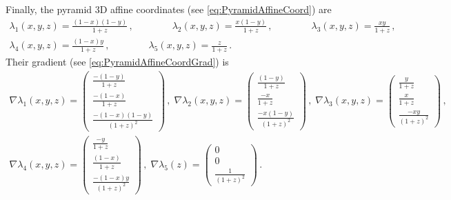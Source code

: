 Finally, the pyramid 3D affine coordinates (see \eqref{eq:PyramidAffineCoord}) are
\begin{equation}
	\begin{gathered}
    \lambda_1(x,y,z)=\textstyle{\frac{(1-x)(1-y)}{1+z}}\,,\qquad\qquad
    \lambda_2(x,y,z)=\textstyle{\frac{x(1-y)}{1+z}}\,,\qquad\qquad
    \lambda_3(x,y,z)=\textstyle{\frac{xy}{1+z}}\,,\\
    \lambda_4(x,y,z)=\textstyle{\frac{(1-x)y}{1+z}}\,,\qquad\qquad
    \lambda_5(x,y,z)=\textstyle{\frac{z}{1+z}}\,.
	\end{gathered}
\end{equation}
Their gradient (see \eqref{eq:PyramidAffineCoordGrad}) is
\begin{equation}
	\begin{gathered}
    \nabla\lambda_1(x,y,z)=\begin{pmatrix}\frac{-(1-y)}{1+z}\\\frac{-(1-x)}{1+z}\\
        \frac{-(1-x)(1-y)}{(1+z)^2}\end{pmatrix}\,,\;
    \nabla\lambda_2(x,y,z)=\begin{pmatrix}\frac{(1-y)}{1+z}\\\frac{-x}{1+z}\\
        \frac{-x(1-y)}{(1+z)^2}\end{pmatrix}\,,\;
    \nabla\lambda_3(x,y,z)=\begin{pmatrix}\frac{y}{1+z}\\\frac{x}{1+z}\\
        \frac{-xy}{(1+z)^2}\end{pmatrix}\,,\\
    \nabla\lambda_4(x,y,z)=\begin{pmatrix}\frac{-y}{1+z}\\\frac{(1-x)}{1+z}\\
        \frac{-(1-x)y}{(1+z)^2}\end{pmatrix}\,,\;
    \nabla\lambda_5(z)=\begin{pmatrix}0\\0\\\frac{1}{(1+z)^2}\end{pmatrix}\,.
	\end{gathered}
\end{equation}

